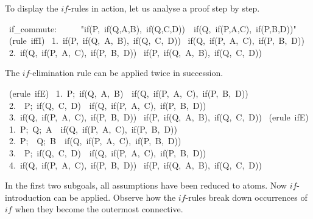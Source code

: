 To display the $if$-rules in action, let us analyse a proof step by step.
\begin{isabelle}
\ if\_commute:\isanewline
\ \ \ \ \ "if(P,\ if(Q,A,B),\
if(Q,C,D))\ <->\ if(Q,\ if(P,A,C),\ if(P,B,D))"\isanewline
{}\ (rule\ iffI)\isanewline
\ 1.\ if(P,\ if(Q,\ A,\ B),\ if(Q,\ C,\ D))\ \isasymLongrightarrow \isanewline
\isaindent{\ 1.\ }if(Q,\ if(P,\ A,\ C),\ if(P,\ B,\ D))\isanewline
\ 2.\ if(Q,\ if(P,\ A,\ C),\ if(P,\ B,\ D))\ \isasymLongrightarrow \isanewline
\isaindent{\ 2.\ }if(P,\ if(Q,\ A,\ B),\ if(Q,\ C,\ D))
\end{isabelle}
The $if$-elimination rule can be applied twice in succession.
\begin{isabelle}
\ (erule\ ifE)\isanewline
\ 1.\ \isasymlbrakk P;\ if(Q,\ A,\ B)\isasymrbrakk \ \isasymLongrightarrow \ if(Q,\ if(P,\ A,\ C),\ if(P,\ B,\ D))\isanewline
\ 2.\ \isasymlbrakk \isasymnot \ P;\ if(Q,\ C,\ D)\isasymrbrakk \ \isasymLongrightarrow \ if(Q,\ if(P,\ A,\ C),\ if(P,\ B,\ D))\isanewline
\ 3.\ if(Q,\ if(P,\ A,\ C),\ if(P,\ B,\ D))\ \isasymLongrightarrow \isanewline
\isaindent{\ 3.\ }if(P,\ if(Q,\ A,\ B),\ if(Q,\ C,\ D))
\isanewline
{}\ (erule\ ifE)\isanewline
\ 1.\ \isasymlbrakk P;\ Q;\ A\isasymrbrakk \ \isasymLongrightarrow \ if(Q,\ if(P,\ A,\ C),\ if(P,\ B,\ D))\isanewline
\ 2.\ \isasymlbrakk P;\ \isasymnot \ Q;\ B\isasymrbrakk \ \isasymLongrightarrow \ if(Q,\ if(P,\ A,\ C),\ if(P,\ B,\ D))\isanewline
\ 3.\ \isasymlbrakk \isasymnot \ P;\ if(Q,\ C,\ D)\isasymrbrakk \ \isasymLongrightarrow \ if(Q,\ if(P,\ A,\ C),\ if(P,\ B,\ D))\isanewline
\ 4.\ if(Q,\ if(P,\ A,\ C),\ if(P,\ B,\ D))\ \isasymLongrightarrow \isanewline
\isaindent{\ 4.\ }if(P,\ if(Q,\ A,\ B),\ if(Q,\ C,\ D))
\end{isabelle}
%
In the first two subgoals, all assumptions have been reduced to atoms.  Now
$if$-introduction can be applied.  Observe how the $if$-rules break down
occurrences of $if$ when they become the outermost connective.
